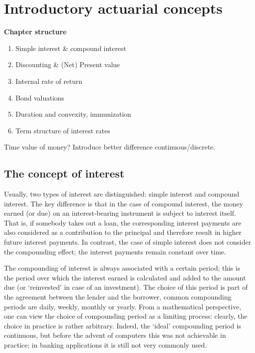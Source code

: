 \chapter{Introductory actuarial concepts}

\begin{framed}
    \textbf{Chapter structure}
    \begin{enumerate}
        \item Simple interest \& compound interest
        \item Discounting \& (Net) Present value
        \item Internal rate of return
        \item Bond valuations
        \item Duration and convexity, immunization
        \item Term structure of interest rates        
    \end{enumerate}
    Time value of money?
    Introduce better difference continuous/discrete.
\end{framed}


\section{The concept of interest}


Usually, two types of interest are distinguished: simple interest and compound interest. The key difference is that in the case of compound interest, the money earned (or due) on an interest-bearing instrument is subject to interest itself. That is, if somebody takes out a loan, the corresponding interest payments are also considered as a contribution to the principal and therefore result in higher future interest payments. In contrast, the case of simple interest does not consider the compounding effect; the interest payments remain constant over time. 

The compounding of interest is always associated with a certain period; this is the period over which the interest earned is calculated and added to the amount due (or `reinvested' in case of an investment). The choice of this period is part of the agreement between the lender and the borrower, common compounding periods are daily, weekly, monthly or yearly. From a mathematical perspective, one can view the choice of compounding period as a limiting process: clearly, the choice in practice is rather arbitrary. Indeed, the `ideal' compounding period is continuous, but before the advent of computers this was not achievable in practice; in banking applications it is still not very commonly used. \cite{Zipf2003}

